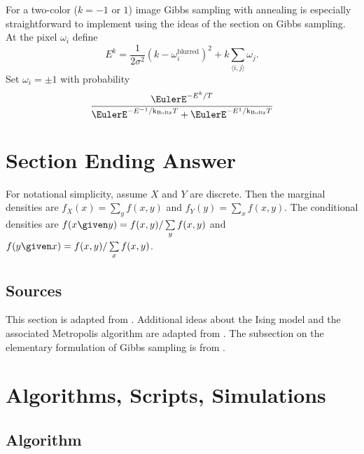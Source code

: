 \documentclass[12pt]{article}
\newcommand{\kT}{{\text k}_{\text{Boltz}}T}
\begin{document}
For a two-color ($k = -1$ or $1$) image Gibbs sampling with annealing is especially straightforward
to implement using the ideas of the section on Gibbs sampling.  At the
pixel $\omega_i$ define
\[
    E^k = \frac{1}{2 \sigma^2}( k - \omega_i^{\text{blurred}})^2 + k
    \sum\limits_{\langle i,j\rangle} \omega_j.
  \]
  Set $\omega_i = \pm 1$ with probability
  \[
    \frac{\EulerE^{-E^k/T}}{\EulerE^{-E^{-1}/\kT} + \EulerE^{-E^1/\kT}}
  \]
  
\section*{Section Ending Answer}

For notational simplicity, assume \( X \) and \( Y \) are discrete.
Then the marginal densities are \( f_X(x) = \sum\limits_y f(x,y) \) and \(
f_Y(y) = \sum_x f(x,y) \).  The conditional densities are \( f(x \given
y) = f(x,y)/\sum\limits_y f(x,y) \) and \( f(y \given x) = f(x,y)/\sum\limits_x
f(x,y) \).

\subsection*{Sources}

This section is adapted from
\cite{richey10}.  Additional ideas about the Ising model and the
associated Metropolis algorithm are adapted from
\cite{schlusser18}.  The subsection on the elementary formulation of
Gibbs sampling is from
\cite{casella92}.

\hr

\section*{Algorithms, Scripts, Simulations}

\subsection*{Algorithm}
\end{document}
